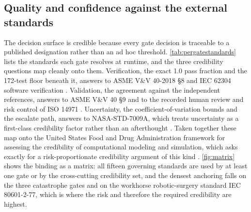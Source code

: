 \subsection{Quality and confidence against the external standards}

The decision surface is credible because every gate decision is traceable to a
published designation rather than an ad hoc threshold.
\autoref{tab:pergatestandards} lists the standards each gate resolves at runtime,
and the three credibility questions map cleanly onto them. Verification, the
exact 1.0 pass fraction and the 172-test floor beneath it, answers to ASME V\&V
40-2018 \S8 and IEC 62304 software verification \cite{asmevv40, iec62304}.
Validation, the agreement against the independent references, answers to ASME
V\&V 40 \S9 and to the recorded human review and risk control of ISO 14971
\cite{iso14971}. Uncertainty, the coefficient-of-variation bounds and the
escalate path, answers to NASA-STD-7009A, which treats uncertainty as a
first-class credibility factor rather than an afterthought \cite{nasastd7009a}.
Taken together these map onto the United States Food and Drug Administration
framework for assessing the credibility of computational modeling and simulation,
which asks exactly for a risk-proportionate credibility argument of this kind
\cite{fda2023credibility}. \autoref{fig:matrix} shows the binding as a matrix:
all fifteen governing standards are used by at least one gate or by the
cross-cutting credibility set, and the densest anchoring falls on the three
catastrophe gates and on the workhorse robotic-surgery standard IEC 80601-2-77,
which is where the risk and therefore the required credibility are highest.

